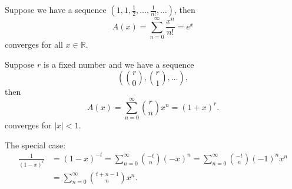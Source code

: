 \begin{eg}
    Suppose we have a sequence \(\left( 1, 1, \frac{1}{2}, \dots , \frac{1}{n!}, \dots  \right) \), then 
    \[
        A(x) = \sum_{n=0}^{\infty} \frac{x^n}{n!} = e^x
    \] converges for all \(x \in \mathbb{R} \).  
\end{eg}

\begin{eg}
    Suppose \(r\) is a fixed number and we have a sequence 
    \[
        \left( \binom{r}{0}, \binom{r}{1}, \dots  \right),
    \]then 
    \[
        A(x) = \sum_{n=0}^{\infty} \binom{r}{n} x^n = (1 + x)^r.  
    \] converges for \(\vert x \vert < 1 \).
\end{eg}

\begin{remark}
    The special case:
    \begin{align*}
        \frac{1}{(1 - x)^t} &= (1 - x)^{-t} = \sum_{n=0}^{\infty} \binom{-t}{n} (-x)^n = \sum_{n=0}^{\infty} \binom{-t}{n} (-1)^n x^n \\
        &= \sum_{n=0}^{\infty} \binom{t + n - 1}{n} x^n. 
    \end{align*}
\end{remark}


